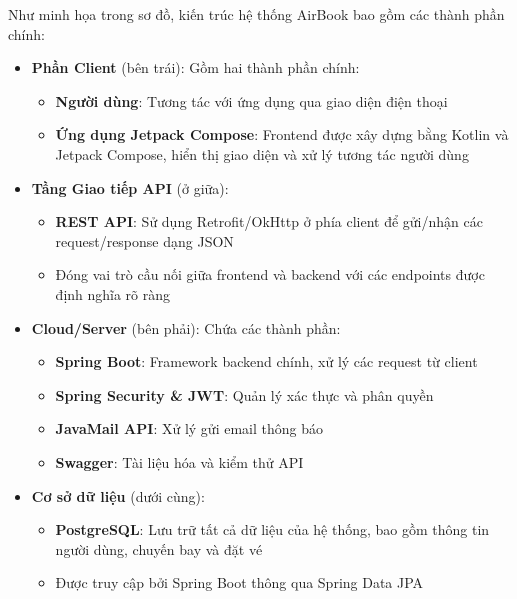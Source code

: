 Như minh họa trong sơ đồ, kiến trúc hệ thống AirBook bao gồm các thành phần chính:

\begin{itemize}[leftmargin=1cm]
    \item \textbf{Phần Client} (bên trái): Gồm hai thành phần chính:
    \begin{itemize}
        \item \textbf{Người dùng}: Tương tác với ứng dụng qua giao diện điện thoại
        \item \textbf{Ứng dụng Jetpack Compose}: Frontend được xây dựng bằng Kotlin và Jetpack Compose, hiển thị giao diện và xử lý tương tác người dùng
    \end{itemize}
    
    \item \textbf{Tầng Giao tiếp API} (ở giữa):
    \begin{itemize}
        \item \textbf{REST API}: Sử dụng Retrofit/OkHttp ở phía client để gửi/nhận các request/response dạng JSON
        \item Đóng vai trò cầu nối giữa frontend và backend với các endpoints được định nghĩa rõ ràng
    \end{itemize}
    
    \item \textbf{Cloud/Server} (bên phải): Chứa các thành phần:
    \begin{itemize}
        \item \textbf{Spring Boot}: Framework backend chính, xử lý các request từ client
        \item \textbf{Spring Security & JWT}: Quản lý xác thực và phân quyền
        \item \textbf{JavaMail API}: Xử lý gửi email thông báo
        \item \textbf{Swagger}: Tài liệu hóa và kiểm thử API
    \end{itemize}
    
    \item \textbf{Cơ sở dữ liệu} (dưới cùng):
    \begin{itemize}
        \item \textbf{PostgreSQL}: Lưu trữ tất cả dữ liệu của hệ thống, bao gồm thông tin người dùng, chuyến bay và đặt vé
        \item Được truy cập bởi Spring Boot thông qua Spring Data JPA
    \end{itemize}
\end{itemize}

